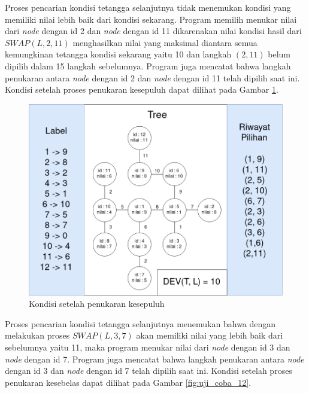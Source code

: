 Proses pencarian kondisi tetangga selanjutnya tidak menemukan kondisi yang memiliki nilai lebih baik dari kondisi sekarang. Program memilih menukar nilai dari \textit{node} dengan id 2 dan \textit{node} dengan id 11 dikarenakan nilai kondisi hasil dari $ SWAP(L, 2, 11) $ menghasilkan nilai yang maksimal diantara semua kemungkinan tetangga kondisi sekarang yaitu 10 dan langkah $ (2,11) $ belum dipilih dalam 15 langkah sebelumnya. Program juga mencatat bahwa langkah penukaran antara \textit{node} dengan id 2 dan \textit{node} dengan id 11 telah dipilih saat ini. Kondisi setelah proses penukaran kesepuluh dapat dilihat pada Gambar \ref{fig:uji_coba_11}.

\begin{figure}[ht]
	\centering\includegraphics[width=1\textwidth]{bab5/figures/uji_coba_11.png}
	\caption{Kondisi setelah penukaran kesepuluh}
	\label{fig:uji_coba_11}
\end{figure}

Proses pencarian kondisi tetangga selanjutnya menemukan bahwa dengan melakukan proses $ SWAP(L, 3, 7) $ akan memiliki nilai yang lebih baik dari sebelumnya yaitu 11, maka program menukar nilai dari \textit{node} dengan id 3 dan \textit{node} dengan id 7. Program juga mencatat bahwa langkah penukaran antara \textit{node} dengan id 3 dan \textit{node} dengan id 7 telah dipilih saat ini. Kondisi setelah proses penukaran kesebelas dapat dilihat pada Gambar \ref{fig:uji_coba_12}.

